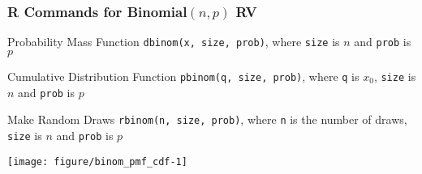 \begin{frame}
  \frametitle{R Commands for Binomial$(n,p)$ RV}

  \begin{block}{Probability Mass Function}
    \alert{\texttt{dbinom(x, size, prob)}}, where \alert{\texttt{size}} is $n$ and \alert{\texttt{prob}} is $p$
  \end{block}

  \begin{block}{Cumulative Distribution Function}
    \alert{\texttt{pbinom(q, size, prob)}}, where \alert{\texttt{q}} is $x_0$, \alert{\texttt{size}} is $n$ and \alert{\texttt{prob}} is $p$
  \end{block}

  \begin{block}{Make Random Draws}
    \alert{\texttt{rbinom(n, size, prob)}}, where \alert{\texttt{n}} is the number of draws, \alert{\texttt{size}} is $n$ and \alert{\texttt{prob}} is $p$
  \end{block}

\end{frame}
\begin{frame}[fragile]
  \footnotesize

\begin{knitrout}
\color{fgcolor}\begin{kframe}
\begin{alltt}
 \hlkwb{<-} \hlopt{:}
 \hlkwb{<-}   \hlstd{=} \hlstd{,}  \hlstd{=} \hlstd{)}
 \hlkwb{<-} \hlstd{(} \hlstd{=} \hlopt{-}\hlstd{,}  \hlstd{=} \hlstd{,}  \hlstd{=} \hlstd{)}
 \hlkwb{<-}   \hlstd{=} \hlstd{,}  \hlstd{=} \hlstd{)}
\hlstd{(} \hlstd{=} \hlstd{(}\hlstd{,} \hlstd{))}
  \hlstd{=} \hlstd{,}  \hlstd{=} \hlstd{,}  \hlstd{=} \hlstd{)}
  \hlstd{=} \hlstd{,}  \hlstd{=} \hlstd{,}  \hlstd{=} \hlstd{)}
\end{alltt}
\end{kframe}
\texttt{[image: figure/binom\_pmf\_cdf-1]} 
\begin{kframe}\begin{alltt}
\hlstd{(} \hlstd{=} \hlstd{(}\hlstd{,} \hlstd{))}
\end{alltt}
\end{kframe}
\end{knitrout}

\end{frame}
